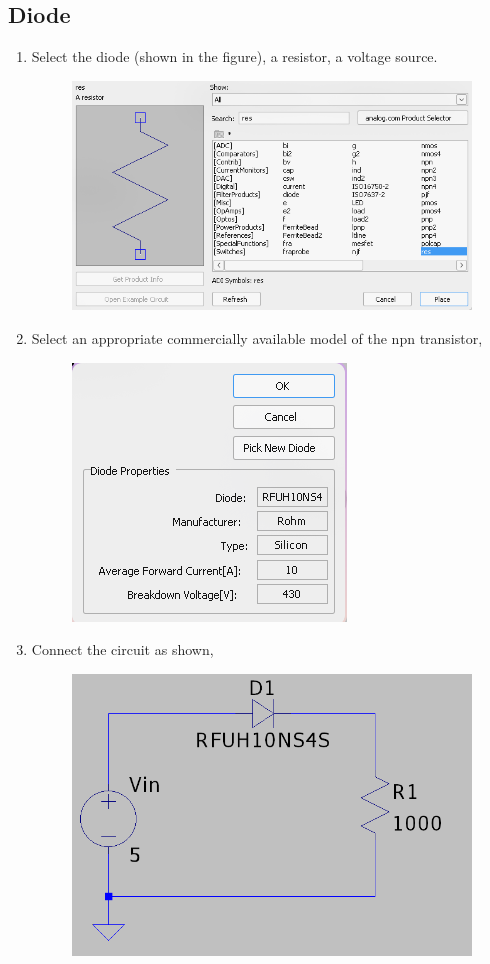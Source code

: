\documentclass[12pt,a4paper]{report}
\begin{document}
\subsection{Diode}
\begin{enumerate}
    \item Select the diode (shown in the figure), a resistor, a voltage source.
    \begin{figure}[h!]
        \centering
        \includegraphics[width = 0.6\linewidth]{figs/component-diode.png}
        \label{fig:placeholder}
    \end{figure}
    \item Select an appropriate commercially available model of the npn transistor,
    \begin{figure}[h!]
        \centering
        \includegraphics[width=0.3\linewidth]{figs/diode-model.png}
        \label{fig:placeholder}
    \end{figure}
    \item Connect the circuit as shown,
    \begin{figure}[h!]
        \centering
        \includegraphics[width=0.5\linewidth]{figs/diode-circuit.png}
        \label{fig:placeholder}
    \end{figure}

\end{enumerate}
\end{document}
